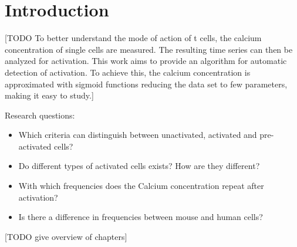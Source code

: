 \chapter{Introduction}
\label{chapter:introduction}

[TODO To better understand the mode of action of t cells, the calcium concentration of single cells are measured. The resulting time series can then be analyzed for activation. This work aims to provide an algorithm for automatic detection of activation. To achieve this, the calcium concentration is approximated with sigmoid functions reducing the data set to few parameters, making it easy to study.]

Research questions:
\begin{itemize}
	\item Which criteria can distinguish between unactivated, activated and pre-activated cells?
	\item Do different types of activated cells exists? How are they different?
	\item With which frequencies does the Calcium concentration repeat after activation?
	\item Is there a difference in frequencies between mouse and human cells?
\end{itemize}

[TODO give overview of chapters]